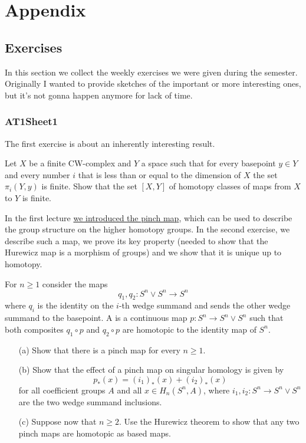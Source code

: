 
\chapter{Appendix}

\section{Exercises}

In this section we collect the weekly exercises we were given during the semester. Originally I wanted to provide sketches of the important or more interesting ones, but it's not gonna happen anymore for lack of time.

\subsection{AT1Sheet1}

The first exercise is about an inherently interesting result.

\label{exercise:AT1Sheet1.1}
Let $X$ be a finite CW-complex and $Y$ a space such that for every basepoint $y\in Y$ and every number $i$ that is less than or equal to the dimension of $X$ the set $\pi_i(Y,y)$ is finite. Show that the set $[X,Y]$ of homotopy classes of maps from $X$ to $Y$ is finite.

\begin{sketch}
\end{sketch}

In the first lecture \hyperref[paragraph:hurewicz-morphism]{we introduced the pinch map}, which can be used to describe the group structure on the higher homotopy groups. In the second exercise, we describe such a map, we prove its key property (needed to show that the Hurewicz map is a morphism of groups) and we show that it is unique up to homotopy.

\label{exercise:AT1Sheet1.2}
For $n \ge 1$ consider the maps
\[q_1, q_2 : S^n\vee S^n\to S^n\]
where $q_i$ is the identity on the $i$-th wedge summand and sends the other wedge summand to the basepoint. A  is a continuous map $p : S^n\to S^n\vee S^n$ such that both
composites $q_1 \circ p$ and $q_2 \circ p$ are homotopic to the identity map of $S^n$.
\begin{enumerate}
    \item[(a)] Show that there is a pinch map for every $n\ge 1$.
    \item[(b)] Show that the effect of a pinch map on singular homology is given by
    \[ p_*(x) = (i_1)_*(x) + (i_2)_*(x)\]
    for all coefficient groups $A$ and all $x\in H_n(S^n,A)$, where $i_1, i_2 : S^n \to S^n\vee S^n$ are the two wedge summand inclusions.
    \item[(c)] Suppose now that $n\ge 2$. Use the Hurewicz theorem to show that any two pinch maps are homotopic as based maps.
\end{enumerate}

